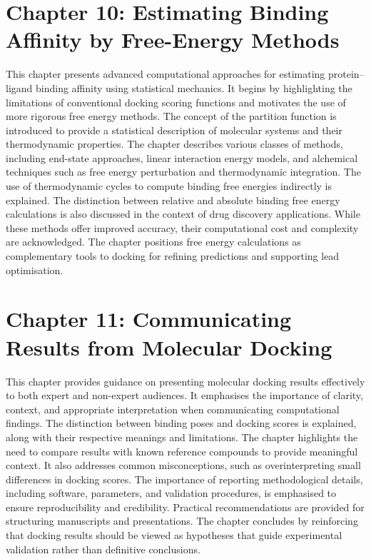 \documentclass[12pt,a4paper]{article}
\begin{document}
\section*{Chapter 10: Estimating Binding Affinity by Free-Energy Methods}
This chapter presents advanced computational approaches for estimating protein–ligand binding affinity using statistical mechanics. It begins by highlighting the limitations of conventional docking scoring functions and motivates the use of more rigorous free energy methods. The concept of the partition function is introduced to provide a statistical description of molecular systems and their thermodynamic properties. The chapter describes various classes of methods, including end-state approaches, linear interaction energy models, and alchemical techniques such as free energy perturbation and thermodynamic integration. The use of thermodynamic cycles to compute binding free energies indirectly is explained. The distinction between relative and absolute binding free energy calculations is also discussed in the context of drug discovery applications. While these methods offer improved accuracy, their computational cost and complexity are acknowledged. The chapter positions free energy calculations as complementary tools to docking for refining predictions and supporting lead optimisation.

\section*{Chapter 11: Communicating Results from Molecular Docking}
This chapter provides guidance on presenting molecular docking results effectively to both expert and non-expert audiences. It emphasises the importance of clarity, context, and appropriate interpretation when communicating computational findings. The distinction between binding poses and docking scores is explained, along with their respective meanings and limitations. The chapter highlights the need to compare results with known reference compounds to provide meaningful context. It also addresses common misconceptions, such as overinterpreting small differences in docking scores. The importance of reporting methodological details, including software, parameters, and validation procedures, is emphasised to ensure reproducibility and credibility. Practical recommendations are provided for structuring manuscripts and presentations. The chapter concludes by reinforcing that docking results should be viewed as hypotheses that guide experimental validation rather than definitive conclusions.
\end{document}
